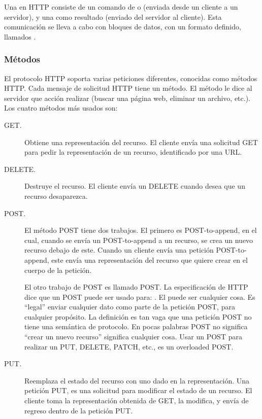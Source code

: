 Una  en HTTP consiste de un comando de  o  (enviada
desde un cliente a un servidor), y una  como resultado (enviado
del servidor al cliente). Esta comunicación se lleva a cabo con bloques
de datos, con un formato definido, llamados .


\subsubsection{Métodos}
\label{\detokenize{chapter_one/rest:metodos}}
El protocolo HTTP soporta varias peticiones diferentes,
conocidas como métodos HTTP. Cada mensaje de solicitud HTTP tiene un
método. El método le dice al servidor que acción realizar (buscar una
página web, eliminar un archivo, etc.). Los cuatro métodos más usados
son:
\begin{description}
\item[{GET.}] \leavevmode
Obtiene una representación del recurso. El cliente envía una
solicitud GET para pedir la representación de un recurso,
identificado por una URL.

\item[{DELETE.}] \leavevmode
Destruye el recurso. El cliente envía un DELETE cuando desea que un
recurso desaparezca.

\item[{POST.}] \leavevmode
El método POST tiene dos trabajos. El primero es POST-to-append, en
el cual, cuando se envía un POST-to-append a un recurso, se crea un
nuevo recurso debajo de este. Cuando un cliente envía una petición
POST-to-append, este envía una representación del recurso que quiere
crear en el cuerpo de la petición.

El otro trabajo de POST es llamado  POST. La
especificación de HTTP dice que un POST puede ser usado para:
. El  puede ser cualquier cosa. Es “legal” enviar
cualquier dato como parte de la petición POST, para cualquier
propósito. La definición es tan vaga que una petición POST no tiene
una semántica de protocolo. En pocas palabras POST no significa
“crear un nuevo recurso” significa cualquier cosa. Usar un POST para
realizar un PUT, DELETE, PATCH, etc., es un overloaded POST.

\item[{PUT.}] \leavevmode
Reemplaza el estado del recurso con uno dado en la representación.
Una petición PUT, es una solicitud para modificar el estado de un
recurso. El cliente toma la representación obtenida de GET, la
modifica, y envía de regreso dentro de la petición PUT.

\end{description}


